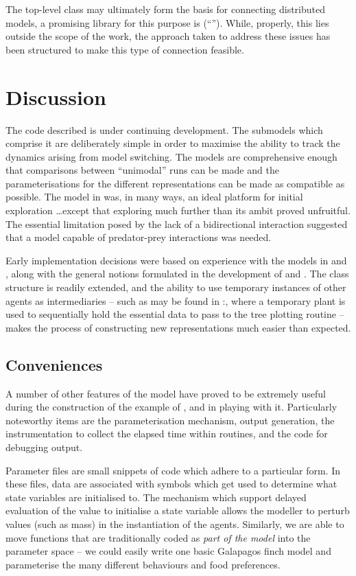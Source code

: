 The top-level  class may ultimately form the
basis for connecting distributed models, a promising library for this
purpose is  (``''). While,
properly, this lies outside the scope of the work, the approach taken
to address these issues has been structured to make this type of
connection feasible.


\section{Discussion}

The code described is under continuing development. The submodels
which comprise it are deliberately simple in order to maximise the
ability to track the dynamics arising from model switching.  The
models are comprehensive enough that comparisons between ``unimodal''
runs can be made and the parameterisations for the different
representations can be made as compatible as possible.  The model
in \Ctwo was, in many ways, an ideal platform for initial
exploration \ldots except that exploring much further than its ambit
proved unfruitful.  The essential limitation posed by the lack of a
bidirectional interaction suggested that a model capable of
predator-prey interactions was needed.

Early implementation decisions were based on experience with the
models in \cite{lyne1994pmez5,gray2006nws} and \cite{grayningaloo},
along with the general notions formulated in the development
of \Ctwo and \Cthree. The class structure is readily extended, and the
ability to use temporary instances of other agents as intermediaries
-- such as may be found in :, where
a temporary plant is used to sequentially hold the essential data to
pass to the tree plotting routine -- makes the process of constructing
new representations much easier than expected.


\subsection{Conveniences}
A number of other features of the model have proved to be extremely
useful during the construction of the example of \Cthree, and in playing with
it. Particularly noteworthy items are the parameterisation mechanism,
output generation, the instrumentation to collect the elapsed time
within routines, and the code for debugging output.

Parameter files are small snippets of \Scheme code which adhere to a
particular form. In these files, data are associated with symbols
which get used to determine what state variables are initialised to.
The mechanism which support delayed evaluation of the value to
initialise a state variable allows the modeller to perturb values
(such as mass) in the instantiation of the agents.  Similarly, we are
able to move functions that are traditionally coded as \emph{part of
  the model} into the parameter space -- we could easily write one
basic Galapagos finch model and parameterise the many different
behaviours and food preferences.

